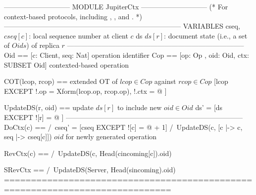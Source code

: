 \documentclass{article}
\begin{document}
\begin{tla}
----------------------------- MODULE JupiterCtx -----------------------------
(*
For context-based \jupiter{} protocols, including \absjupiter{}, \cjupiter{}, and \xjupiter{}.
*)
-----------------------------------------------------------------------------
VARIABLES 
    cseq,  \* $cseq[c]$: local sequence number at client $c$
    ds     \* $ds[r]$: document state (i.e., a set of $Oids$) of replica $r$
-----------------------------------------------------------------------------
Oid == [c: Client, seq: Nat] \* operation identifier
Cop == [op: Op , oid: Oid, ctx: SUBSET Oid] \* contexted-based operation

COT(lcop, rcop) == \* extended OT of $lcop \in Cop$ against $rcop \in Cop$
    [lcop EXCEPT !.op = Xform(lcop.op, rcop.op), !.ctx = @ ]

UpdateDS(r, oid) == \* update $ds[r]$ to include new $oid \in Oid$
    ds' = [ds EXCEPT ![r] = @ ]
-----------------------------------------------------------------------------
DoCtx(c) == 
    /\ cseq' = [cseq EXCEPT ![c] = @ + 1]
    /\ UpdateDS(c, [c |-> c, seq |-> cseq[c]]) \* $oid$ for newly generated operation

RevCtx(c) == 
    /\ UpdateDS(c, Head(cincoming[c]).oid)
    
SRevCtx == 
    /\ UpdateDS(Server, Head(sincoming).oid)
=============================================================================
\end{tla}
\end{document}
